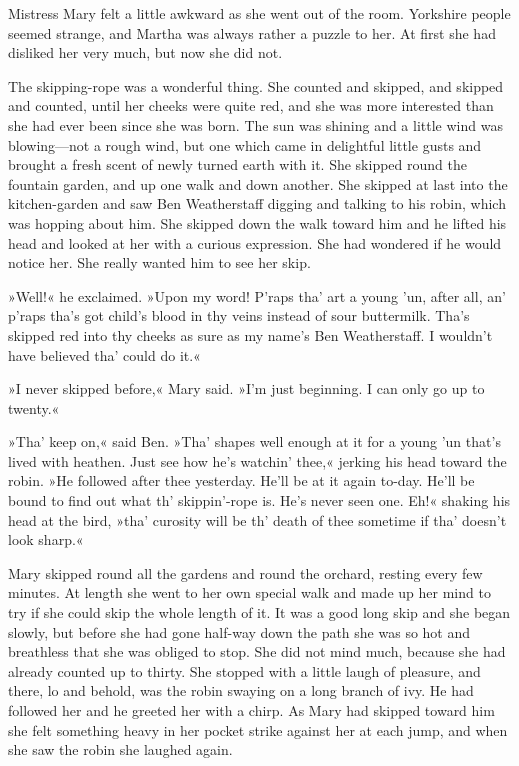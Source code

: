 Mistress Mary felt a little awkward as she went out of the room. Yorkshire people seemed strange, and Martha was always rather a puzzle to her. At first she had disliked her very much, but now she did not.

The skipping-rope was a wonderful thing. She counted and skipped, and skipped and counted, until her cheeks were quite red, and she was more interested than she had ever been since she was born. The sun was shining and a little wind was blowing—not a rough wind, but one which came in delightful little gusts and brought a fresh scent of newly turned earth with it. She skipped round the fountain garden, and up one walk and down another. She skipped at last into the kitchen-garden and saw Ben Weatherstaff digging and talking to his robin, which was hopping about him. She skipped down the walk toward him and he lifted his head and looked at her with a curious expression. She had wondered if he would notice her. She really wanted him to see her skip.

»Well!« he exclaimed. »Upon my word! P'raps tha' art a young 'un, after all, an' p'raps tha's got child's blood in thy veins instead of sour buttermilk. Tha's skipped red into thy cheeks as sure as my name's Ben Weatherstaff. I wouldn't have believed tha' could do it.«

»I never skipped before,« Mary said. »I'm just beginning. I can only go up to twenty.«

»Tha' keep on,« said Ben. »Tha' shapes well enough at it for a young 'un that's lived with heathen. Just see how he's watchin' thee,« jerking his head toward the robin. »He followed after thee yesterday. He'll be at it again to-day. He'll be bound to find out what th' skippin'-rope is. He's never seen one. Eh!« shaking his head at the bird, »tha' curosity will be th' death of thee sometime if tha' doesn't look sharp.«

Mary skipped round all the gardens and round the orchard, resting every few minutes. At length she went to her own special walk and made up her mind to try if she could skip the whole length of it. It was a good long skip and she began slowly, but before she had gone half-way down the path she was so hot and breathless that she was obliged to stop. She did not mind much, because she had already counted up to thirty. She stopped with a little laugh of pleasure, and there, lo and behold, was the robin swaying on a long branch of ivy. He had followed her and he greeted her with a chirp. As Mary had skipped toward him she felt something heavy in her pocket strike against her at each jump, and when she saw the robin she laughed again.

